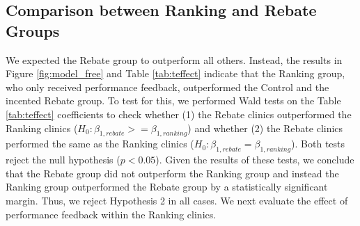 \begin{onehalfspace}
  \begin{table}[htbp]
 \end{table}
 
 \subsection{Comparison between Ranking and Rebate Groups}
 We expected the Rebate group to outperform all others. Instead, the results in Figure \ref{fig:model_free} and Table \ref{tab:teffect} indicate that the Ranking group, who only received performance feedback, outperformed the Control and the incented Rebate group. To test for this, we performed Wald tests on the Table \ref{tab:teffect} coefficients to check whether (1) the Rebate clinics outperformed the Ranking clinics ($H_0: \beta_{1,rebate} >= \beta_{1,ranking}$) and whether (2) the Rebate clinics performed the same as the Ranking clinics ($H_0: \beta_{1,rebate} = \beta_{1,ranking}$). Both tests reject the null hypothesis ($p < 0.05$). Given the results of these tests, we conclude that the Rebate group did not outperform the Ranking group and instead the Ranking group outperformed the Rebate group by a statistically significant margin. Thus, we reject Hypothesis 2 in all cases. We next evaluate the effect of performance feedback within the Ranking clinics. 
 

\end{onehalfspace}
